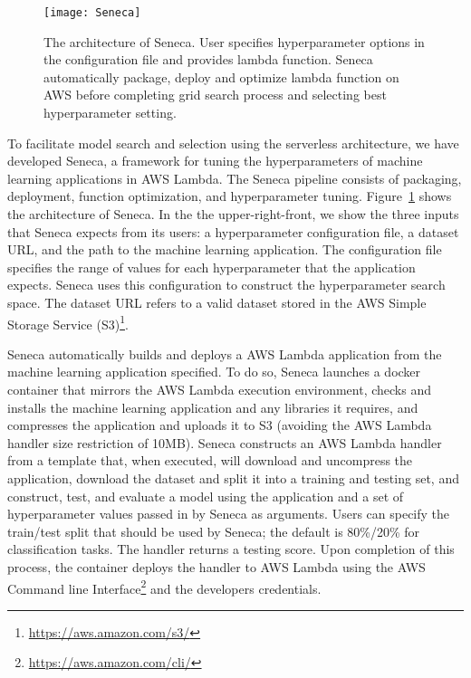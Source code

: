 \begin{figure}[t] \centering 
\texttt{[image: Seneca]}
\caption{The architecture of Seneca. 
User specifies hyperparameter options in the configuration file and provides lambda function. Seneca automatically package, deploy and optimize lambda function on AWS before completing grid search process and selecting best hyperparameter setting.
\label{fig:seneca}}
\end{figure}

To facilitate model search and selection using the serverless architecture, 
we have developed Seneca, 
a framework for tuning the hyperparameters of machine learning applications 
in AWS Lambda. 
The Seneca pipeline consists of packaging, deployment, 
function optimization, and hyperparameter tuning. Figure~\ref{fig:seneca} 
shows the architecture of Seneca.  In the the upper-right-front, we
show the three inputs that Seneca expects from its users: a hyperparameter
configuration file, a dataset URL, and the path to 
the machine learning application.
The configuration file
specifies the range of values for each hyperparameter that the 
application expects.  Seneca uses this configuration to construct
the hyperparameter search space.  The dataset URL refers to a
valid dataset stored in the AWS Simple Storage 
Service (S3)\footnote{\url{https://aws.amazon.com/s3/}}.

Seneca automatically builds and deploys a AWS Lambda application
from the machine learning application specified.
To do so, Seneca launches a docker container that mirrors the
AWS Lambda execution environment, checks and installs
the machine learning application and any libraries it requires,
and compresses the application and uploads it to S3 (avoiding
the AWS Lambda handler size restriction of 10MB).
Seneca constructs an AWS Lambda handler from a template
that, when executed, will download and uncompress the application,
download the dataset and split it into a training and testing set,
and construct, test, and evaluate a model using the application
and a set of hyperparameter values passed in by Seneca as arguments.
Users can specify the train/test split that should be used by Seneca; the
default is 80\%/20\% for classification tasks.
The handler returns a testing score. 
Upon completion of this process, the container deploys the handler
to AWS Lambda using the
AWS Command line Interface\footnote{\url{https://aws.amazon.com/cli/}} 
and the developers credentials.



